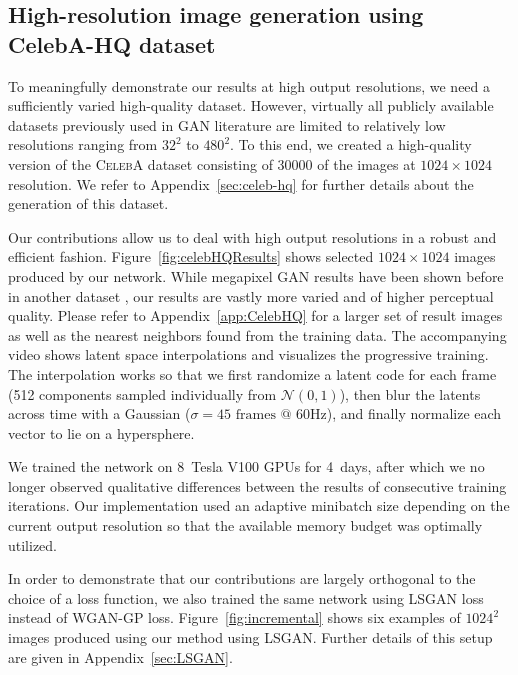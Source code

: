 \documentclass{article}
\begin{document}
\subsection{High-resolution image generation using CelebA-HQ dataset}
\label{sec:exp-celeb-hq}

\figcelebHQResults

To meaningfully demonstrate our results at high output resolutions, we need a sufficiently varied high-quality dataset.
However, virtually all publicly available datasets previously used in GAN literature are limited to relatively low resolutions ranging from $32^2$ to $480^2$.
To this end, we created a high-quality version of the \textsc{CelebA} dataset consisting of 30000 of the images at $1024\times1024$ resolution. We refer to Appendix~\ref{sec:celeb-hq} for further details about the generation of this dataset.

Our contributions allow us to deal with high output resolutions in a robust and efficient fashion.
Figure~\ref{fig:celebHQResults} shows selected $1024\times1024$ images produced by our network.
While megapixel GAN results have been shown before in another dataset \citep{Marchesi2017}, our results are vastly more varied and of higher perceptual quality.
Please refer to Appendix~\ref{app:CelebHQ} for a larger set of result images as well as the nearest neighbors found from the training data. The accompanying video shows latent space interpolations and visualizes the progressive training.
The interpolation works so that we first randomize a latent code for each frame (512 components sampled individually from $\mathcal{N}(0,1)$), then blur the latents across time with a Gaussian ($\sigma=45\text{ frames @ 60Hz}$), and finally normalize each vector to lie on a hypersphere.

We trained the network on 8~Tesla V100 GPUs for 4~days, after which we no longer observed qualitative differences between the results of consecutive training iterations.
Our implementation used an adaptive minibatch size depending on the current output resolution so that the available memory budget was optimally utilized. %

In order to demonstrate that our contributions are largely orthogonal to the choice of a loss function, we also trained the same network using LSGAN loss instead of WGAN-GP loss. Figure~\ref{fig:incremental} shows six examples of $1024^2$ images produced using our method using LSGAN. Further details of this setup are given in Appendix~\ref{sec:LSGAN}.
\end{document}
